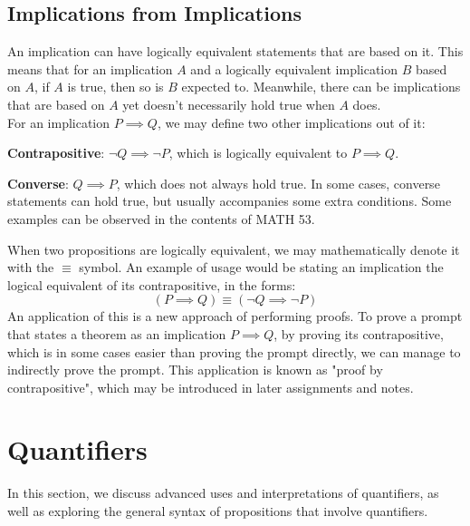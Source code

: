 \subsection{Implications from Implications}
An implication can have logically equivalent statements that are based on it. This means that for an implication $A$ and a logically equivalent implication $B$ based on $A$, if $A$ is true, then so is $B$ expected to. Meanwhile, there can be implications that are based on $A$ yet doesn't necessarily hold true when $A$ does. \\
For an implication $P \implies Q$, we may define two other implications out of it:
\begin{bindenum}
    \item \textbf{Contrapositive}: $\neg Q \implies \neg P$, which is logically equivalent to $P \implies Q$.
    \item \textbf{Converse}: $Q \implies P$, which does not always hold true. In some cases, converse statements can hold true, but usually accompanies some extra conditions. Some examples can be observed in the contents of MATH 53.
\end{bindenum}
When two propositions are logically equivalent, we may mathematically denote it with the $\equiv$ symbol. An example of usage would be stating an implication the logical equivalent of its contrapositive, in the forms:
\[(P \implies Q) \equiv (\neg Q \implies \neg P)\]
An application of this is a new approach of performing proofs. To prove a prompt that states a theorem as an implication $P \implies Q$, by proving its contrapositive, which is in some cases easier than proving the prompt directly, we can manage to indirectly prove the prompt. This application is known as "proof by contrapositive", which may be introduced in later assignments and notes.

\section{Quantifiers}
In this section, we discuss advanced uses and interpretations of quantifiers, as well as exploring the general syntax of propositions that involve quantifiers.

